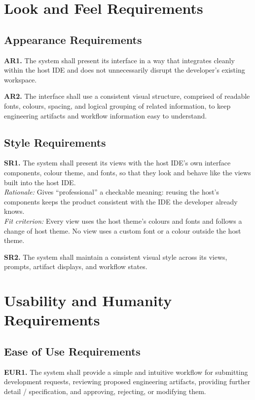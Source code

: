 \documentclass[12pt]{article}
\begin{document}
\section{Look and Feel Requirements}
\subsection{Appearance Requirements}

\noindent\textbf{AR1.} The system shall present its interface in a way that integrates cleanly within the host IDE and does not unnecessarily disrupt the developer's existing workspace.

\noindent\textbf{AR2.} The interface shall use a consistent visual structure, comprised of readable fonts, colours, spacing, and logical grouping of related information, to keep engineering artifacts and workflow information easy to understand.

\subsection{Style Requirements}

\noindent\textbf{SR1.} The system shall present its views with the host IDE's own interface components, colour theme, and fonts, so that they look and behave like the views built into the host IDE.\\
\textit{Rationale:} Gives ``professional'' a checkable meaning: reusing the host's components keeps the product consistent with the IDE the developer already knows.\\
\textit{Fit criterion:} Every view uses the host theme's colours and fonts and follows a change of host theme. No view uses a custom font or a colour outside the host theme.

\noindent\textbf{SR2.} The system shall maintain a consistent visual style across its views, prompts, artifact displays, and workflow states.

\section{Usability and Humanity Requirements}
\subsection{Ease of Use Requirements}

\noindent\textbf{EUR1.} The system shall provide a simple and intuitive workflow for submitting development requests, reviewing proposed engineering artifacts, providing further detail / specification, and approving, rejecting, or modifying them.
\end{document}
